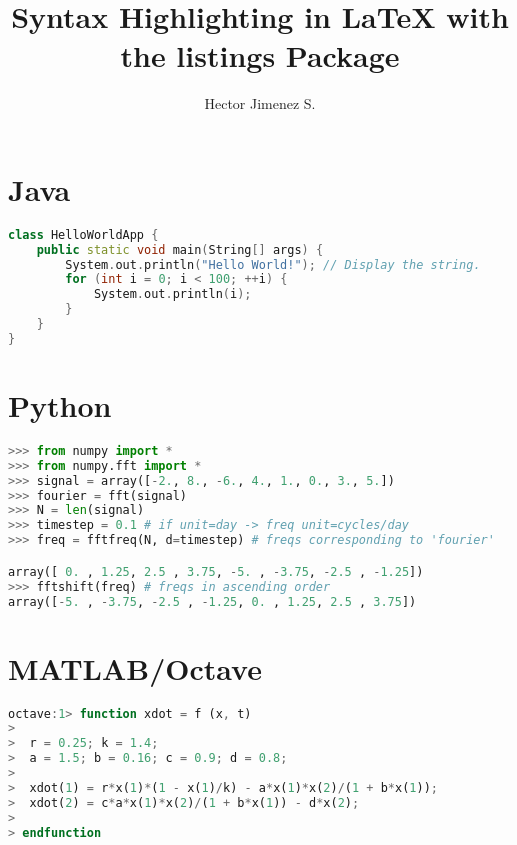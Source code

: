 \documentclass[12pt]{article}
\title{Syntax Highlighting in LaTeX with the listings Package}
\author{Hector Jimenez S.}
\begin{document}
\maketitle

\section{Java}
\begin{lstlisting}[language=c++]
class HelloWorldApp {
    public static void main(String[] args) {
        System.out.println("Hello World!"); // Display the string.
        for (int i = 0; i < 100; ++i) {
            System.out.println(i);
        }
    }
}
\end{lstlisting}

\section{Python}
\begin{lstlisting}[language=python]
>>> from numpy import *
>>> from numpy.fft import *
>>> signal = array([-2., 8., -6., 4., 1., 0., 3., 5.])
>>> fourier = fft(signal)
>>> N = len(signal)
>>> timestep = 0.1 # if unit=day -> freq unit=cycles/day
>>> freq = fftfreq(N, d=timestep) # freqs corresponding to 'fourier'

array([ 0. , 1.25, 2.5 , 3.75, -5. , -3.75, -2.5 , -1.25])
>>> fftshift(freq) # freqs in ascending order
array([-5. , -3.75, -2.5 , -1.25, 0. , 1.25, 2.5 , 3.75])
\end{lstlisting}

\section{MATLAB/Octave}
\begin{lstlisting}[language=octave]
octave:1> function xdot = f (x, t)
>
>  r = 0.25; k = 1.4;
>  a = 1.5; b = 0.16; c = 0.9; d = 0.8;
>
>  xdot(1) = r*x(1)*(1 - x(1)/k) - a*x(1)*x(2)/(1 + b*x(1));
>  xdot(2) = c*a*x(1)*x(2)/(1 + b*x(1)) - d*x(2);
>
> endfunction
\end{lstlisting}
\end{document}

